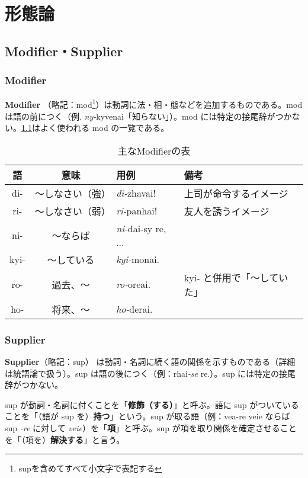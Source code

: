 \chapter{形態論}

\section{Modifier・Supplier}

\subsection{Modifier}
\textbf{Modifier} （略記：mod\footnote{supを含めてすべて小文字で表記する}）は動詞に法・相・態などを追加するものである。mod は語の前につく（例. \emph{ny-}kyvenai「知らない」）。mod には特定の接尾辞がつかない。\cref{table:common-mods}はよく使われる mod の一覧である。

\begin{table}[h]
    \centering
    \caption{主なModifierの表}
    \label{table:common-mods}
    \begin{tabular}{ccll}
        \hline
        語 & 意味 & 用例 & 備考 \\
        \hline \hline
        di-  & ～しなさい（強） & \emph{di-}zhavai! & 上司が命令するイメージ \\
        ri-  & ～しなさい（弱） & \emph{ri-}panhai! & 友人を誘うイメージ\\
        ni-  & ～ならば   & \emph{ni-}dai-sy re, ...& \\
        kyi- & ～している & \emph{kyi-}monai. & \\
        ro-  & 過去、～   & \emph{ro-}oreai. & kyi- と併用で「～していた」\\
        ho-  & 将来、～   & \emph{ho-}derai. & \\
        \hline
    \end{tabular}
\end{table}

\subsection{Supplier}

\textbf{Supplier}（略記：sup） は動詞・名詞に続く語の関係を示すものである（詳細は統語論で扱う）。sup は語の後につく（例：rhai\emph{-se} re.）。sup には特定の接尾辞がつかない。

sup が動詞・名詞に付くことを「\textbf{修飾（する）}」と呼ぶ。語に sup がついていることを「（語が sup を）\textbf{持つ}」という。sup が取る語（例：vea-re veie ならば sup \emph{-re} に対して \emph{veie}）を「\textbf{項}」と呼ぶ。sup が項を取り関係を確定させることを「（項を）\textbf{解決する}」と言う。

